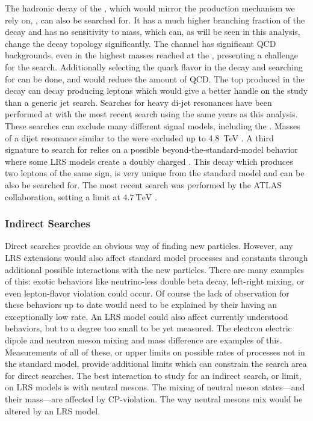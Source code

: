 The hadronic decay of the \WR, which would mirror the production mechanism we rely on, \WRtoQQ, can also be searched for.  It has a much higher branching fraction of the \WR decay and has no sensitivity to \NR mass, which can, as will be seen in this analysis, change the \WR decay topology significantly. The \WRtoQQ \xspace channel has significant QCD backgrounds, even in the highest masses reached at the \LHC, presenting a challenge for the search.  Additionally selecting the quark flavor in the decay and searching for \WRtoTB\xspace can be done, and would reduce the amount of QCD. The top produced in the \WR decay can decay producing leptons which would give a better handle on the study than a generic jet search. Searches for heavy di-jet resonances have been performed at \CMS with the most recent search using the same years as this analysis.  These searches can exclude many different signal models, including the \WR.  Masses of a dijet resonance similar to the \WR were excluded up to \SI{4.8}{\TeV} \cite{dijetRunIICMS}.  A third \WR signature to search for relies on a possible beyond-the-standard-model behavior where some LRS models create a doubly charged \WR. This decay which produces two leptons of the same sign, is very unique from the standard model and can be also be searched for. The most recent search was performed by the ATLAS collaboration, setting a limit at \ensuremath{\SI{4.7}{\TeV}} \cite{ATLASresWR}.

\subsubsection{Indirect Searches}
Direct searches provide an obvious way of finding new particles. However, any LRS extensions would also affect standard model processes and constants through additional possible interactions with the new particles. There are many examples of this: exotic behaviors like neutrino-less double beta decay, left-right mixing, or even lepton-flavor violation could occur. Of course the lack of observation for these behaviors up to date would need to be explained by their having an exceptionally low rate.  An LRS model could also affect currently understood behaviors, but to a degree too small to be yet measured.  The electron electric dipole and neutron meson mixing and mass difference are examples of this.  Measurements of all of these, or upper limits on possible rates of processes not in the standard model, provide additional limits which can constrain the search area for direct searches.  The best interaction to study for an indirect search, or limit, on LRS models is with neutral mesons.  The mixing of neutral meson states---and their mass---are affected by CP-violation. The way neutral mesons mix would be altered by an LRS model.  

